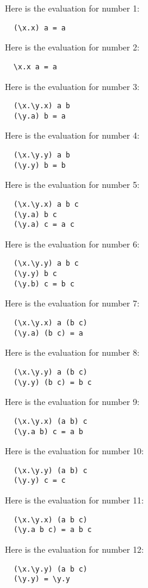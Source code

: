 \documentclass{article}
\theoremstyle{theorem}
\theoremstyle{definition}
\theoremstyle{remark}
\begin{document}
Here is the evaluation for number 1:
\begin{verbatim}
  (\x.x) a = a 
\end{verbatim}  

Here is the evaluation for number 2:
\begin{verbatim}
  \x.x a = a   
\end{verbatim}  

Here is the evaluation for number 3:
\begin{verbatim}
  (\x.\y.x) a b 
  (\y.a) b = a
\end{verbatim}  

Here is the evaluation for number 4:
\begin{verbatim}
  (\x.\y.y) a b   
  (\y.y) b = b
\end{verbatim}  

Here is the evaluation for number 5:
\begin{verbatim}
  (\x.\y.x) a b c  
  (\y.a) b c
  (\y.a) c = a c
\end{verbatim}  

Here is the evaluation for number 6:
\begin{verbatim}
  (\x.\y.y) a b c
  (\y.y) b c
  (\y.b) c = b c
\end{verbatim}  

Here is the evaluation for number 7:
\begin{verbatim}
  (\x.\y.x) a (b c)
  (\y.a) (b c) = a
\end{verbatim}  

Here is the evaluation for number 8:
\begin{verbatim}
  (\x.\y.y) a (b c)
  (\y.y) (b c) = b c 
\end{verbatim}  

Here is the evaluation for number 9:
\begin{verbatim}
  (\x.\y.x) (a b) c
  (\y.a b) c = a b
\end{verbatim}  

Here is the evaluation for number 10:
\begin{verbatim}
  (\x.\y.y) (a b) c
  (\y.y) c = c 
\end{verbatim}  

Here is the evaluation for number 11:
\begin{verbatim}
  (\x.\y.x) (a b c)
  (\y.a b c) = a b c
\end{verbatim}  

Here is the evaluation for number 12:
\begin{verbatim}
  (\x.\y.y) (a b c)
  (\y.y) = \y.y
\end{verbatim}  
\end{document}
